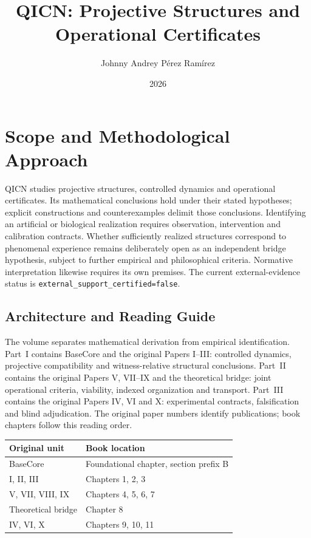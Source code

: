 \documentclass[11pt,a4paper,openany]{book}
\title{\textbf{QICN: Projective Structures and Operational Certificates}}
\author{Johnny Andrey P{\'e}rez Ram{\'i}rez}
\date{2026}
\begin{document}
\frontmatter
\maketitle
\chapter*{Scope and Methodological Approach}

QICN studies projective structures, controlled dynamics and operational
certificates. Its mathematical conclusions hold under their stated hypotheses;
explicit constructions and counterexamples delimit those conclusions.
Identifying an artificial or biological realization requires observation,
intervention and calibration contracts. Whether sufficiently realized
structures correspond to phenomenal experience remains deliberately open as
an independent bridge hypothesis, subject to further empirical and philosophical
criteria. Normative interpretation likewise requires its own premises.
The current external-evidence status is
\texttt{external\_support\_certified=false}.

\section*{Architecture and Reading Guide}
The volume separates mathematical derivation from empirical identification.
Part~I contains BaseCore and the original Papers I--III: controlled dynamics,
projective compatibility and witness-relative structural conclusions.
Part~II contains the original Papers V, VII--IX and the theoretical bridge:
joint operational criteria, viability, indexed organization and transport.
Part~III contains the original Papers IV, VI and X: experimental contracts,
falsification and blind adjudication. The original paper numbers identify
publications; book chapters follow this reading order.

\begin{center}\small
\begin{tabular}{ll}
\toprule Original unit & Book location \\ \midrule
BaseCore & Foundational chapter, section prefix B \\
I, II, III & Chapters 1, 2, 3 \\
V, VII, VIII, IX & Chapters 4, 5, 6, 7 \\
Theoretical bridge & Chapter 8 \\
IV, VI, X & Chapters 9, 10, 11 \\ \bottomrule
\end{tabular}
\end{center}
\end{document}
